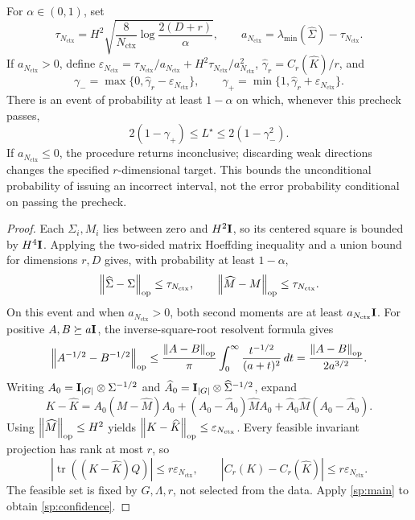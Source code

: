 \begin{spectraltheorem}
\label{sp:finite}
For $\alpha\in(0,1)$, set
\[
 \tau_{N_{\mathrm{ctx}}}=H^2\sqrt{\frac{8}{N_{\mathrm{ctx}}}\log\frac{2(D+r)}\alpha},\qquad
 a_{N_{\mathrm{ctx}}}=\lambda_{\min}(\widehat\Sigma)-\tau_{N_{\mathrm{ctx}}}.
\]
If $a_{N_{\mathrm{ctx}}}>0$, define $\varepsilon_{N_{\mathrm{ctx}}}=\tau_{N_{\mathrm{ctx}}}/a_{N_{\mathrm{ctx}}}+H^2\tau_{N_{\mathrm{ctx}}}/a_{N_{\mathrm{ctx}}}^2$, $\widehat\gamma_r=C_r(\widehat K)/r$, and
\[
 \gamma_- =\max\{0,\widehat\gamma_r-\varepsilon_{N_{\mathrm{ctx}}}\},\qquad
 \gamma_+ =\min\{1,\widehat\gamma_r+\varepsilon_{N_{\mathrm{ctx}}}\}.
\]
There is an event of probability at least $1-\alpha$ on which, whenever this precheck passes,
\begin{equation}
 2(1-\gamma_+)\le L^\star\le2(1-\gamma_-^2).
 \label{sp:confidence}
\end{equation}
If $a_{N_{\mathrm{ctx}}}\le0$, the procedure returns inconclusive; discarding weak directions changes the specified $r$-dimensional target. This bounds the unconditional probability of issuing an incorrect interval, not the error probability conditional on passing the precheck.
\end{spectraltheorem}
\begin{proof}
Each $\Sigma_i,M_i$ lies between zero and $H^2\mathbf{I}$, so its centered square is bounded by $H^4\mathbf{I}$. Applying the two-sided matrix Hoeffding inequality \citep[Theorem~1.3]{tropp2012user} and a union bound for dimensions $r,D$ gives, with probability at least $1-\alpha$,
\[
 \left\lVert \widehat\Sigma-\Sigma\right\rVert_{\rm op}\le\tau_{N_{\mathrm{ctx}}},\qquad
 \left\lVert \widehat M-M\right\rVert_{\rm op}\le\tau_{N_{\mathrm{ctx}}}.
\]
On this event and when $a_{N_{\mathrm{ctx}}}>0$, both second moments are at least $a_{N_{\mathrm{ctx}}}\mathbf{I}$. For positive $A,B\succeq a\mathbf{I}$, the inverse-square-root resolvent formula gives
\[
 \left\lVert A^{-1/2}-B^{-1/2}\right\rVert_{\rm op}
 \le\frac{\left\lVert A-B\right\rVert_{\rm op}}\pi\int_0^\infty\frac{t^{-1/2}}{(a+t)^2}\,dt
 =\frac{\left\lVert A-B\right\rVert_{\rm op}}{2a^{3/2}}.
\]
Writing $A_0=\mathbf{I}_{|G|}\otimes\Sigma^{-1/2}$ and $\widehat A_0=\mathbf{I}_{|G|}\otimes\widehat\Sigma^{-1/2}$, expand
\[
 K-\widehat K=A_0(M-\widehat M)A_0
 +(A_0-\widehat A_0)\widehat M A_0
 +\widehat A_0\widehat M(A_0-\widehat A_0).
\]
Using $\left\lVert \widehat M\right\rVert_{\rm op}\le H^2$ yields $\left\lVert K-\widehat K\right\rVert_{\rm op}\le\varepsilon_{N_{\mathrm{ctx}}}$. Every feasible invariant projection has rank at most $r$, so
\[
 |\operatorname{tr}((K-\widehat K)Q)|\le r\varepsilon_{N_{\mathrm{ctx}}},
 \qquad |C_r(K)-C_r(\widehat K)|\le r\varepsilon_{N_{\mathrm{ctx}}}.
\]
The feasible set is fixed by $G,\Lambda,r$, not selected from the data. Apply \cref{sp:main} to obtain \cref{sp:confidence}.
\end{proof}

